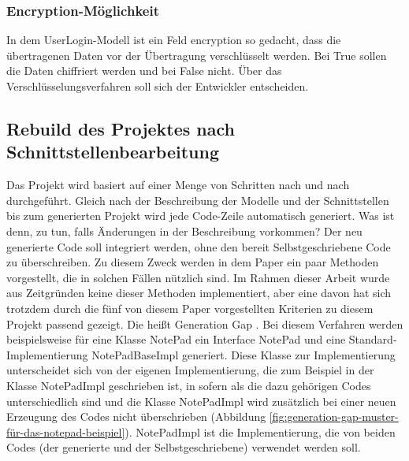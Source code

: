 \documentclass[a4paper,twoside]{article}
\begin{document}
	\subsubsection{Encryption-M\"oglichkeit}
	In dem UserLogin-Modell ist ein Feld encryption so gedacht, dass die \"ubertragenen Daten vor der \"Ubertragung verschl\"usselt werden. Bei True sollen die Daten chiffriert werden und bei False nicht. \"Uber das Verschl\"usselungsverfahren soll sich der Entwickler entscheiden.
	
	\subsection{Rebuild des Projektes nach Schnittstellenbearbeitung}
	
	Das Projekt wird basiert auf einer Menge von Schritten nach und nach durchgeführt. Gleich nach der Beschreibung der Modelle und der Schnittstellen bis zum generierten Projekt wird jede Code-Zeile automatisch generiert. Was ist denn, zu tun, falls Änderungen in der Beschreibung vorkommen? Der neu generierte Code soll integriert werden, ohne den bereit Selbstgeschriebene Code zu überschreiben. Zu diesem Zweck werden in dem Paper \cite{timo2015} ein paar Methoden vorgestellt, die in solchen Fällen nützlich sind. Im Rahmen dieser Arbeit wurde aus Zeitgründen keine dieser Methoden implementiert, aber eine davon hat sich trotzdem durch die fünf von diesem Paper vorgestellten Kriterien zu diesem Projekt passend gezeigt. Die heißt Generation Gap \cite{timo2015_3_1}.
	Bei diesem Verfahren werden beispielsweise für eine Klasse NotePad ein Interface NotePad und eine Standard-Implementierung NotePadBaseImpl generiert. Diese Klasse zur Implementierung unterscheidet sich von der eigenen Implementierung, die zum Beispiel in der Klasse NotePadImpl geschrieben ist, in sofern als die dazu gehörigen Codes unterschiedlich sind und die Klasse NotePadImpl wird zusätzlich bei einer neuen Erzeugung des Codes nicht überschrieben (Abbildung \ref{fig:generation-gap-muster-für-das-notepad-beispiel}). NotePadImpl ist die Implementierung, die von beiden Codes (der generierte und der Selbstgeschriebene) verwendet werden soll.
	
\end{document}
